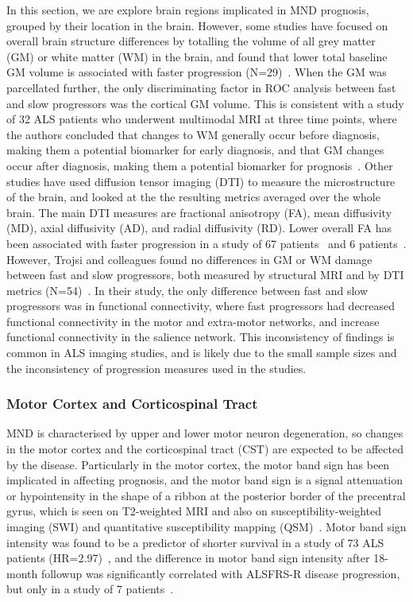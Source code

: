In this section, we are explore brain regions implicated in MND prognosis, grouped by their location in the brain.
However, some studies have focused on overall brain structure differences by totalling the volume of all grey matter (GM) or white matter (WM) in the brain, and found that lower total baseline GM volume is associated with faster progression (N=29)~\cite{elmendiliAssociationBrainUpper2023}.
When the GM was parcellated further, the only discriminating factor in ROC analysis between fast and slow progressors was the cortical GM volume.
This is consistent with a study of 32 ALS patients who underwent multimodal MRI at three time points, where the authors concluded that changes to WM generally occur before diagnosis, making them a potential biomarker for early diagnosis, and that GM changes occur after diagnosis, making them a potential biomarker for prognosis~\cite{bedeLongitudinalStructuralChanges2018}.
Other studies have used diffusion tensor imaging (DTI) to measure the microstructure of the brain, and looked at the the resulting metrics averaged over the whole brain.
The main DTI measures are fractional anisotropy (FA), mean diffusivity (MD), axial diffusivity (AD), and radial diffusivity (RD).
Lower overall FA has been associated with faster progression in a study of 67 patients~\cite{sendaStructuralMRICorrelates2017} and 6 patients~\cite{baldaranovLongitudinalDiffusionTensor2017}.
However, Trojsi and colleagues found no differences in GM or WM damage between fast and slow progressors, both measured by structural MRI and by DTI metrics (N=54)~\cite{trojsiRestingStateFunctional2021}.
In their study, the only difference between fast and slow progressors was in functional connectivity, where fast progressors had decreased functional connectivity in the motor and extra-motor networks, and increase functional connectivity in the salience network.
This inconsistency of findings is common in ALS imaging studies, and is likely due to the small sample sizes and the inconsistency of progression measures used in the studies.

\subsubsection*{Motor Cortex and Corticospinal Tract}
MND is characterised by upper and lower motor neuron degeneration, so changes in the motor cortex and the corticospinal tract (CST) are expected to be affected by the disease.
Particularly in the motor cortex, the motor band sign has been implicated in affecting prognosis, and the motor band sign is a signal attenuation or hypointensity in the shape of a ribbon at the posterior border of the precentral gyrus, which is seen on T2-weighted MRI and also on susceptibility-weighted imaging (SWI) and quantitative susceptibility mapping (QSM)~\cite{bollHypointensityMotorCortex2019}.
Motor band sign intensity was found to be a predictor of shorter survival in a study of 73 ALS patients (HR=2.97)~\cite{rizzoDiagnosticPrognosticValue2020}, and the difference in motor band sign intensity after 18-month followup was significantly correlated with ALSFRS-R disease progression, but only in a study of 7 patients~\cite{bollHypointensityMotorCortex2019}.

